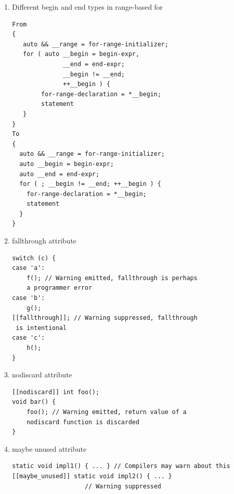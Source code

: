 \documentclass[12pt]{article}
\begin{document}
{\begin{enumerate}
\begin{lstlisting}
constexpr int AddEleven(int n) {
  // Initialization of the 'data member' for n can
  // occur within a constant expression since 'n' is
  // of literal type.
  return [n] { return n + 11; }();
}
static_assert(AddEleven(5) == 16);
\end{lstlisting}
\item Different begin and end types in range-based for
\begin{lstlisting}
From
{
   auto && __range = for-range-initializer;
   for ( auto __begin = begin-expr,
              __end = end-expr;
              __begin != __end;
              ++__begin ) {
        for-range-declaration = *__begin;
        statement
   }
}
To
{
  auto && __range = for-range-initializer;
  auto __begin = begin-expr;
  auto __end = end-expr;
  for ( ; __begin != __end; ++__begin ) {
    for-range-declaration = *__begin;
    statement
  }
}
\end{lstlisting}
\item fallthrough attribute
\begin{lstlisting}
switch (c) {
case 'a':
    f(); // Warning emitted, fallthrough is perhaps 
    a programmer error
case 'b':
    g();
[[fallthrough]]; // Warning suppressed, fallthrough
 is intentional
case 'c':
    h();
}
\end{lstlisting}
\item nodiscard attribute
\begin{lstlisting}
[[nodiscard]] int foo();
void bar() {
    foo(); // Warning emitted, return value of a 
    nodiscard function is discarded
}
\end{lstlisting}
\item maybe unused attribute
\begin{lstlisting}
static void impl1() { ... } // Compilers may warn about this
[[maybe_unused]] static void impl2() { ... } 
					// Warning suppressed



\end{lstlisting}
\end{enumerate}}
\end{document}
